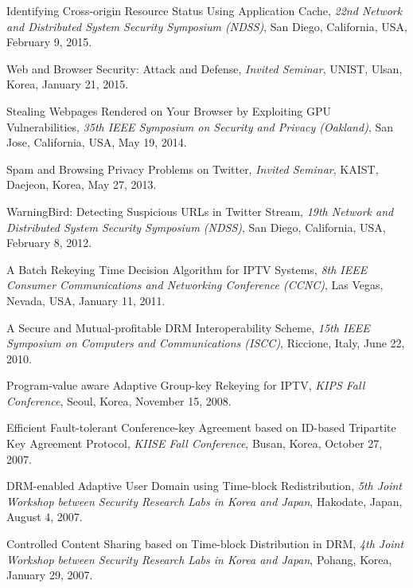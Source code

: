 \documentclass[letterpaper]{article}
\renewenvironment{itemize}{
  \begin{list}{}{
    \setlength{\leftmargin}{1.5em}
  }
}{
  \end{list}
}
\begin{document}
\begin{itemize}
\item Identifying Cross-origin Resource Status Using Application Cache, {\it 22nd Network and 
    Distributed System Security Symposium (NDSS)}, San Diego, California, USA, February 9, 2015.
\item Web and Browser Security: Attack and Defense, {\it Invited Seminar}, UNIST, Ulsan, Korea, January 21, 2015.
\item Stealing Webpages Rendered on Your Browser by Exploiting GPU Vulnerabilities, {\it 35th IEEE Symposium on Security and Privacy (Oakland)}, San Jose, California, USA, May 19, 2014.
\item Spam and Browsing Privacy Problems on Twitter, {\it Invited Seminar}, KAIST, Daejeon, Korea, May 27, 2013.
\item WarningBird: Detecting Suspicious URLs in Twitter Stream, {\it 19th Network and 
    Distributed System Security Symposium (NDSS)}, San Diego, California, USA, February 8, 2012.
\item A Batch Rekeying Time Decision Algorithm for IPTV Systems, {\it 8th IEEE Consumer
    Communications and Networking Conference (CCNC)}, Las Vegas, Nevada, USA, January 11, 2011.
\item A Secure and Mutual-profitable DRM Interoperability Scheme, {\it 15th IEEE Symposium on
    Computers and Communications (ISCC)}, Riccione, Italy, June 22, 2010.
\item Program-value aware Adaptive Group-key Rekeying for IPTV, {\it KIPS Fall Conference}, Seoul,
  Korea, November 15, 2008.
\item Efficient Fault-tolerant Conference-key Agreement based on ID-based Tripartite Key Agreement
  Protocol, {\it KIISE Fall Conference}, Busan, Korea, October 27, 2007.
\item DRM-enabled Adaptive User Domain using Time-block Redistribution, {\it 5th Joint Workshop
    between Security Research Labs in Korea and Japan}, Hakodate, Japan, August 4, 2007.
\item Controlled Content Sharing based on Time-block Distribution in DRM, {\it 4th Joint Workshop
    between Security Research Labs in Korea and Japan}, Pohang, Korea, January 29, 2007.
\end{itemize}
\end{document}
